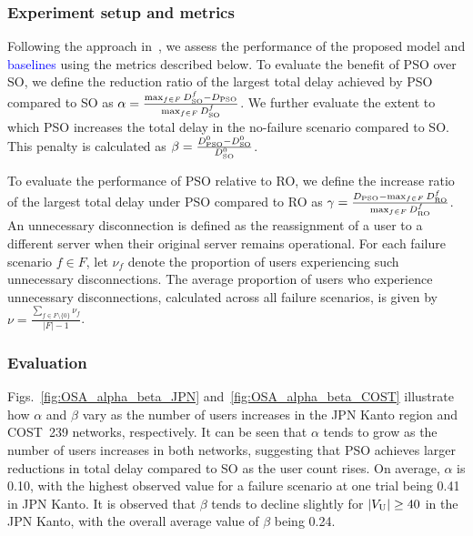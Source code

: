 \documentclass[10pt, letterpaper]{IEEEtran}
\newcommand\blue[1]{\textcolor{blue}{#1}}
\begin{document}
\begin{CJK}{UTF8}{ipxm}
\subsubsection{Experiment setup and metrics}
Following the approach in~\cite{5_9_13_Kamrul2010, 5_9_Masuda2020}, we assess the performance of the proposed model and \blue{baselines} using the metrics described below.
To evaluate the benefit of PSO over SO, we define the reduction ratio of the largest total delay achieved by PSO compared to SO as
$\alpha = \frac{\max_{f \in F}D^f_{\rm SO} - D_{\rm PSO}}{\max_{f \in F}D^f_{\rm SO}}$.
We further evaluate the extent to which PSO increases the total delay in the no-failure scenario compared to SO. This penalty is calculated as
$\beta = \frac{D^0_{\rm PSO} - D^0_{\rm SO}}{D^0_{\rm SO}}$.

To evaluate the performance of PSO relative to RO, we define the increase ratio of the largest total delay under PSO compared to RO as
$\gamma = \frac{D_{\rm PSO} - \max_{f \in F}D^f_{\rm RO}}{\max_{f \in F}D^f_{\rm RO}}$.
An unnecessary disconnection is defined as the reassignment of a user to a different server when their original server remains operational.
For each failure scenario $f \in F$, let $\nu_f$ denote the proportion of users experiencing such unnecessary disconnections.
The average proportion of users who experience unnecessary disconnections, calculated across all failure scenarios, is given by
$\nu = \frac{\sum_{f \in F \setminus \{0\}}\nu_f}{|F| - 1}$.

\subsubsection{Evaluation}
Figs.~\ref{fig:OSA_alpha_beta_JPN} and~\ref{fig:OSA_alpha_beta_COST} illustrate how $\alpha$ and $\beta$ vary as the number of users increases in the JPN Kanto region and COST~239 networks, respectively.
It can be seen that $\alpha$ tends to grow as the number of users increases in both networks, suggesting that PSO achieves larger reductions in total delay compared to SO as the user count rises.
On average, $\alpha$ is 0.10, with the highest observed value for a failure scenario at one trial being 0.41 in JPN Kanto.
It is observed that $\beta$ tends to decline slightly for $|V_{\rm U}| \geq 40$ in the JPN Kanto, with the overall average value of $\beta$ being 0.24.


\end{CJK}
\end{document}
